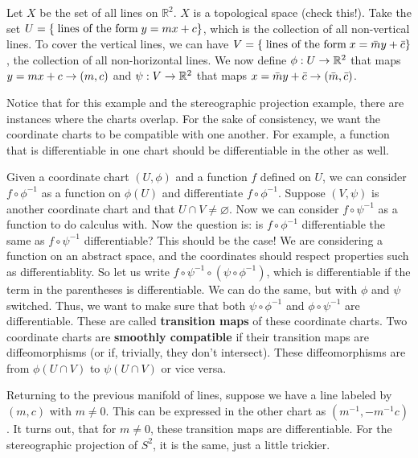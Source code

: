 \documentclass{mathnotes}
\begin{document}
\begin{exmp}
    Let $X$ be the set of all lines on $\mathbb{R}^2$. $X$ is a topological space (check this!). Take the set $U=\left\{ \;\textnormal{lines of the form}\; y=mx+c \right\}$,
    which is the collection of all non-vertical lines. To cover the vertical lines, we can have $V=\left\{ \;\textnormal{lines of the form}\;x=\bar{m}y+\bar{c} \right\}$,
    the collection of all non-horizontal lines. We now define $\phi:U\rightarrow\mathbb{R}^2$ that maps $y=mx+c\rightarrow(m,c)$ and $\psi:V\rightarrow\mathbb{R}^2$ that maps
    $x=\bar{m}y+\bar{c}\rightarrow(\bar{m},\bar{c})$.
\end{exmp}

Notice that for this example and the stereographic projection example, there are instances where the charts overlap. For the sake of consistency, we want
the coordinate charts to be compatible with one another. For example, a function that is differentiable in one chart should be differentiable in the other
as well.

\begin{defn}
    Given a coordinate chart $(U,\phi)$ and a function $f$ defined on $U$, we can consider $f\circ \phi^{-1}$ as a function on $\phi(U)$ and differentiate
    $f\circ \phi^{-1}$. Suppose $(V,\psi)$ is another coordinate chart and that $U\cap V\neq \varnothing$. Now we can consider $f\circ\psi^{-1}$ as a function
    to do calculus with. Now the question is: is $f\circ \phi^{-1}$ differentiable the same as $f\circ\psi^{-1}$ differentiable? This should be the case!
    We are considering a function on an abstract space, and the coordinates should respect properties such as differentiablity. So let us write
    $f\circ\psi^{-1}\circ(\psi\circ\phi^{-1})$, which is differentiable if the term in the parentheses is differentiable. We can do the same, but with
    $\phi$ and $\psi$ switched. Thus, we want to make sure that both $\psi\circ\phi^{-1}$ and $\phi\circ\psi^{-1}$ are differentiable. These are called
    \textbf{transition maps} of these coordinate charts. Two coordinate charts are \textbf{smoothly compatible} if their transition maps are diffeomorphisms
    (or if, trivially, they don't intersect). These diffeomorphisms are from $\phi(U\cap V)$ to $\psi(U\cap V)$ or vice versa.
\end{defn}

Returning to the previous manifold of lines, suppose we have a line labeled by $(m,c)$ with $m\neq 0$. This can be expressed in the other chart as
$(m^{-1},-m^{-1}c)$. It turns out, that for $m\neq 0$, these transition maps are differentiable. For the stereographic projection of $S^2$, it is the same,
just a little trickier.
\end{document}
